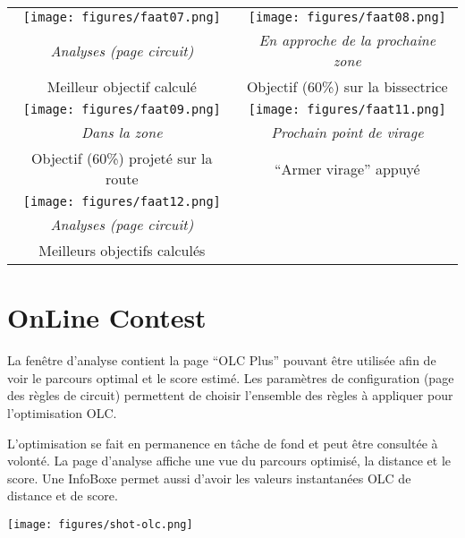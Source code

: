 \begin{maxipage}
\begin{center}
\begin{longtable}{|c|c|}
\toprule
\texttt{[image: figures/faat07.png]} & 
\texttt{[image: figures/faat08.png]} \\
\emph{Analyses (page circuit)} & \emph{En approche de la prochaine zone} \\
Meilleur objectif calculé & Objectif (60\%) sur la bissectrice \\

\midrule
\texttt{[image: figures/faat09.png]} & 
\texttt{[image: figures/faat11.png]} \\
\emph{Dans la zone} & \emph{Prochain point de virage} \\
Objectif (60\%) projeté sur la route & ``Armer virage'' appuyé \\

\midrule
\texttt{[image: figures/faat12.png]} &  \\
\emph{Analyses (page circuit)} &  \\
Meilleurs objectifs calculés &  \\

\bottomrule
\end{longtable}
\end{center}
\end{maxipage}

\section{OnLine Contest}

La fenêtre d'analyse contient la page ``OLC Plus'' pouvant être
utilisée afin de voir le parcours optimal et le score estimé. Les paramètres de configuration 
(page des règles de circuit) permettent de choisir l'ensemble des règles à appliquer pour l'optimisation OLC.\@

L'optimisation se fait en permanence en tâche de fond et peut être consultée à volonté. La page d'analyse affiche une vue du parcours
optimisé, la distance et le score. Une InfoBoxe permet aussi d'avoir les valeurs instantanées OLC de distance et de score.

\begin{center}
\texttt{[image: figures/shot-olc.png]}
\end{center}

